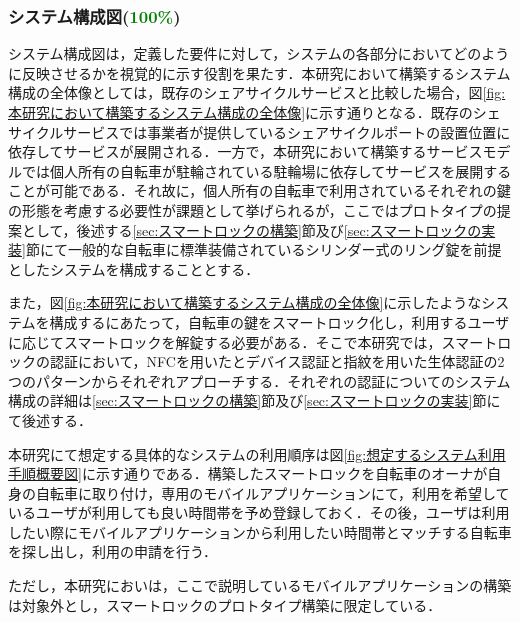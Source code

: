       \subsubsection{システム構成図(\textcolor{green}{100\%})}
        \label{sec:システム構成図}
          \par システム構成図は，定義した要件に対して，システムの各部分においてどのように反映させるかを視覚的に示す役割を果たす．本研究において構築するシステム構成の全体像としては，既存のシェアサイクルサービスと比較した場合，図\ref{fig:本研究において構築するシステム構成の全体像}に示す通りとなる．既存のシェサイクルサービスでは事業者が提供しているシェアサイクルポートの設置位置に依存してサービスが展開される．一方で，本研究において構築するサービスモデルでは個人所有の自転車が駐輪されている駐輪場に依存してサービスを展開することが可能である．それ故に，個人所有の自転車で利用されているそれぞれの鍵の形態を考慮する必要性が課題として挙げられるが，ここではプロトタイプの提案として，後述する\ref{sec:スマートロックの構築}節及び\ref{sec:スマートロックの実装}節にて一般的な自転車に標準装備されているシリンダー式のリング錠を前提としたシステムを構成することとする．
           \par また，図\ref{fig:本研究において構築するシステム構成の全体像}に示したようなシステムを構成するにあたって，自転車の鍵をスマートロック化し，利用するユーザに応じてスマートロックを解錠する必要がある．そこで本研究では，スマートロックの認証において，NFCを用いたとデバイス認証と指紋を用いた生体認証の2つのパターンからそれぞれアプローチする．それぞれの認証についてのシステム構成の詳細は\ref{sec:スマートロックの構築}節及び\ref{sec:スマートロックの実装}節にて後述する．
           \par 本研究にて想定する具体的なシステムの利用順序は図\ref{fig:想定するシステム利用手順概要図}に示す通りである．構築したスマートロックを自転車のオーナが自身の自転車に取り付け，専用のモバイルアプリケーションにて，利用を希望しているユーザが利用しても良い時間帯を予め登録しておく．その後，ユーザは利用したい際にモバイルアプリケーションから利用したい時間帯とマッチする自転車を探し出し，利用の申請を行う．
           \par ただし，本研究においは，ここで説明しているモバイルアプリケーションの構築は対象外とし，スマートロックのプロトタイプ構築に限定している．
          
